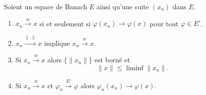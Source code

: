 \begin{proposition}     \label{PROPooFJBBooKkRwIp}
	Soient un espace de Banach \( E\) ainsi qu'une suite \( (x_n)\) dans \( E\).
	\begin{enumerate}
		\item       \label{ITEMooDMMTooSBINKN}
		      \( x_n\stackrel{w}{\longrightarrow}x\) si et seulement si \( \varphi(x_n)\to\varphi(x)\) pour tout \( \varphi\in E'\).
		\item       \label{ITEMooFZKXooNqFGUb}
		      \( x_n\stackrel{\| . \|}{\longrightarrow}x\) implique \( x_n\stackrel{w}{\longrightarrow}x\).
		\item       \label{ITEMooXPTSooYPwNgU}
		      Si \( x_n\stackrel{w}{\longrightarrow}x\) alors \( \{ \| x_n \| \}\) est borné et
		      \begin{equation}
			      \| x \|\leq \liminf\| x_n \|.
		      \end{equation}
		\item       \label{ITEMooAFRFooOXdsBy}
		      Si \( x_n\stackrel{w}{\longrightarrow}x\) et \( \varphi_n\stackrel{E'}{\longrightarrow}\varphi\) alors \( \varphi_n(x_n)\to\varphi(x)\).
	\end{enumerate}
\end{proposition}

